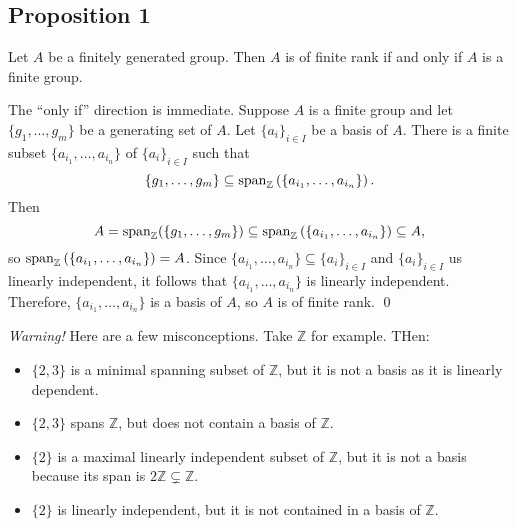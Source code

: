 \documentclass{article}
\renewenvironment{proof}{{\bfseries\color{blue1} Proof:}}{\qed}
\begin{document}
\subsection{Proposition 1}
\begin{idea}
    Let $A$ be a finitely generated group. Then $A$ is of finite rank if and only if $A$ is a finite group.
\end{idea}
\begin{proof}
    The ``only if'' direction is immediate. Suppose $A$ is a finite group and let $\{g_1,\dots,g_m\}$ be a generating set of $A$. Let $\{a_i\}_{i \in I}$ be a basis of $A$. There is a finite subset $\{a_{i_1},\dots,a_{i_n}\}$ of $\{a_i\}_{i\in I}$ such that
    \begin{equation}
        \{g_1,\dots,g_m\} \subseteq \mathrm{span}_{\mathbb{Z}}\left(\left\{a_{i_1},\dots,a_{i_n}\right\}\right).
    \end{equation}
    Then
    \begin{equation}
        A = \mathrm{span}_{\mathbb{Z}}(\{g_1,\dots,g_m\}) \subseteq \mathrm{span}_{\mathbb{Z}}\left(\left\{a_{i_1},\dots,a_{i_n}\right\}\right) \subseteq A,
    \end{equation}
    so $\mathrm{span}_{\mathbb{Z}}\left(\left\{a_{i_1},\dots,a_{i_n}\right\}\right) = A$. Since $\{a_{i_1},\dots,a_{i_n}\} \subseteq \{a_i\}_{i \in I}$ and $\{a_i\}_{i\in I}$ us linearly independent, it follows that $\{a_{i_1},\dots,a_{i_n}\}$ is linearly independent. Therefore, $\{a_{i_1},\dots,a_{i_n}\}$ is a basis of $A$, so $A$ is of finite rank.
\end{proof}
\vspace{2mm}

\textit{Warning!} Here are a few misconceptions. Take $\mathbb{Z}$ for example. THen:
\begin{itemize}
    \item $\{2,3\}$ is a minimal spanning subset of $\mathbb{Z}$, but it is not a basis as it is linearly dependent.
    \item $\{2,3\}$ spans $\mathbb{Z}$, but does not contain a basis of $\mathbb{Z}$.
    \item $\{2\}$ is a maximal linearly independent subset of $\mathbb{Z}$, but it is not a basis because its span is $2\mathbb{Z} \subsetneq
              \mathbb{Z}$.
    \item $\{2\}$ is linearly independent, but it is not contained in a basis of $\mathbb{Z}$.
\end{itemize}
\end{document}
